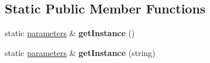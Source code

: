 \subsection*{Static Public Member Functions}
\begin{DoxyCompactItemize}
\item 
\mbox{\label{classparameters_afd0f251397ef8deef8bbb63c7d86bebb}} 
static \mbox{\hyperlink{classparameters}{parameters}} \& {\bfseries get\+Instance} ()
\item 
\mbox{\label{classparameters_aec2cc19583134030d567ea02455adf8a}} 
static \mbox{\hyperlink{classparameters}{parameters}} \& {\bfseries get\+Instance} (string)
\end{DoxyCompactItemize}
